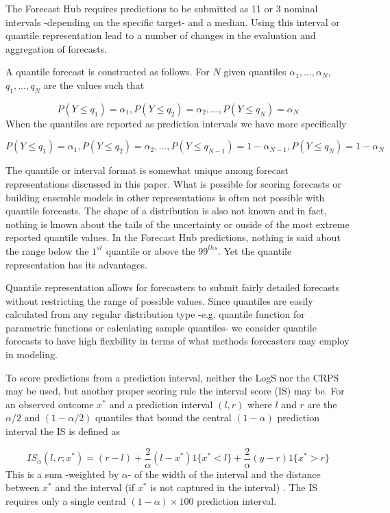\documentclass{article}\usepackage[]{graphicx}\usepackage[]{color}
\begin{document}
The Forecast Hub requires predictions to be submitted as 11 or 3 nominal 
intervals -depending on the specific target- and a median.
Using this interval or quantile representation lead to a number of changes in 
the evaluation and aggregation of forecasts.

A quantile forecast is constructed as follows.
For $N$ given quantiles $\alpha_1,..., \alpha_N$, $q_1,..., q_N$ are the values
such that 

\begin{equation}
  P(Y \leq q_1) = \alpha_1, P(Y \leq q_2) = \alpha_2, ..., 
  P(Y \leq q_N) = \alpha_N
\end{equation}
When the quantiles are reported as prediction intervals we have more 
specifically

\begin{equation}
  P(Y \leq q_1) = \alpha_1, P(Y \leq q_2) = \alpha_2, ...,
  P(Y \leq q_{N-1}) = 1 - \alpha_{N-1}, P(Y \leq q_N) = 1 - \alpha_N
\end{equation}

The quantile or interval format is somewhat unique among forecast 
representations discussed in this paper. What is possible for scoring forecasts
or building ensemble models in other representations is often not possible with
quantile forecasts. The shape of a distribution is also not known and in fact,
nothing is known about the tails of the uncertainty or ouside of the most 
extreme reported quantile values. In the Forecast Hub predictions, nothing 
is said about the range below the $1^{st}$ quantile or above the $99^{ths}$.
Yet the quantile representation has its advantages. 

Quantile representation allows for forecasters to submit fairly detailed
forecasts without restricting the range of possible values.
Since quantiles are easily calculated from any regular distribution type
-e.g. quantile function for parametric functions or calculating sample 
quantiles- we consider quantile forecasts to have high flexbility in terms of 
what methods forecasters may employ in modeling.

To score predictions from a prediction interval, 
neither the LogS nor the CRPS may be used, 
but another proper scoring rule the interval score (IS) may be.
For an observed outcome $x^*$ and a prediction interval $(l,r)$ 
where $l$ and $r$ are the $\alpha/2$ and $(1-\alpha/2)$ quantiles that bound
the central $(1-\alpha)$ prediction interval the IS is defined as

\begin{equation}
\label{eq:is}
  IS_{\alpha}(l,r; x^*) = (r-l) + \frac{2}{\alpha}(l-x^*)1\{x^*<l\} 
  + \frac{2}{\alpha}(y-r)1\{x^* > r\}
\end{equation}
This is a sum -weighted by 
$\alpha$- of the width of the
interval and the distance between $x^*$ and the interval (if $x^*$ is not 
captured in the interval) \cite{gneiting2014probabilistic}. 
The IS requires only a single central 
$(1-\alpha) \times 100$ prediction interval.
\end{document}
